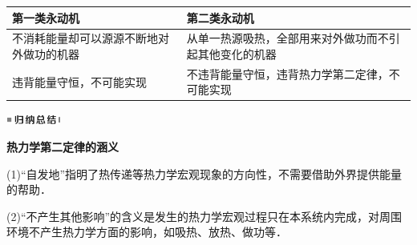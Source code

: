 \begin{longtable}[]{@{}m{5cm}m{5cm}@{}}
\toprule
第一类永动机 & 第二类永动机\tabularnewline
\midrule
\endhead
不消耗能量却可以源源不断地对外做功的机器 &
从单一热源吸热，全部用来对外做功而不引起其他变化的机器\tabularnewline
违背能量守恒，不可能实现 &
不违背能量守恒，违背热力学第二定律，不可能实现\tabularnewline
\bottomrule
\end{longtable}


\begin{center}\includegraphics[width=0.70764in,height=0.12292in]{media/image13.png}\end{center}
\begin{center}
    \textbf{热力学第二定律的涵义}
\end{center}

(1)``自发地''指明了热传递等热力学宏观现象的方向性，不需要借助外界提供能量的帮助．

(2)``不产生其他影响''的含义是发生的热力学宏观过程只在本系统内完成，对周围环境不产生热力学方面的影响，如吸热、放热、做功等．
